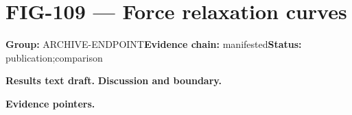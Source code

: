 \clearpage
\section{FIG-109 --- Force relaxation curves}
\label{figpage:fig-109}
\textbf{Group:} ARCHIVE-ENDPOINT\quad \textbf{Evidence chain:} manifested\quad \textbf{Status:} publication;comparison

\textbf{Results text draft.} 
\textbf{Discussion and boundary.} 


\textbf{Evidence pointers.}



\vfill
